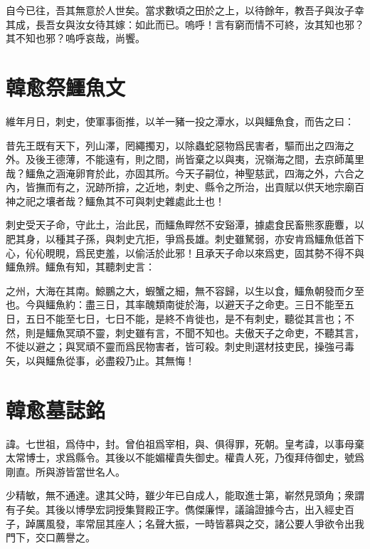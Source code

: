 自今已往，吾其無意於人世矣。當求數頃之田於之上，以待餘年，教吾子與汝子幸其成，長吾女與汝女待其嫁：如此而已。嗚呼！言有窮而情不可終，汝其知也邪？其不知也邪？嗚呼哀哉，尚饗。

\section[祭鱷魚文\quad{\small 韓愈}]{{\normalsize 韓愈}\quad 祭鱷魚文}
{\parindent=0pt 維年月日，刺史，使軍事衙推，以羊一豬一投之潭水，以與鱷魚食，而告之曰：}

昔先王既有天下，列山澤，罔繩擉刃，以除蟲蛇惡物爲民害者，驅而出之四海之外。及後王德薄，不能遠有，則之間，尚皆棄之以與夷，況嶺海之間，去京師萬里哉？鱷魚之涵淹卵育於此，亦固其所。今天子嗣位，神聖慈武，四海之外，六合之內，皆撫而有之，況跡所揜，之近地，刺史、縣令之所治，出貢賦以供天地宗廟百神之祀之壤者哉？鱷魚其不可與刺史雜處此土也！

刺史受天子命，守此土，治此民，而鱷魚睅然不安谿潭，據處食民畜熊豕鹿麞，以肥其身，以種其子孫，與刺史亢拒，爭爲長雄。刺史雖駑弱，亦安肯爲鱷魚低首下心，伈伈睍睍，爲民吏羞，以偷活於此邪！且承天子命以來爲吏，固其勢不得不與鱷魚辨。鱷魚有知，其聽刺史言：

之州，大海在其南。鯨鵬之大，蝦蟹之細，無不容歸，以生以食，鱷魚朝發而夕至也。今與鱷魚約：盡三日，其率醜類南徙於海，以避天子之命吏。三日不能至五日，五日不能至七日，七日不能，是終不肯徙也，是不有刺史，聽從其言也；不然，則是鱷魚冥頑不靈，刺史雖有言，不聞不知也。夫傲天子之命吏，不聽其言，不徙以避之；與冥頑不靈而爲民物害者，皆可殺。刺史則選材技吏民，操強弓毒矢，以與鱷魚從事，必盡殺乃止。其無悔！

\section[柳子厚墓誌銘\quad{\small 韓愈}]{{\normalsize 韓愈}\quad {}墓誌銘}
諱。七世祖，爲侍中，封。曾伯祖爲宰相，與、俱得罪，死朝。皇考諱，以事母棄太常博士，求爲縣令。其後以不能媚權貴失御史。權貴人死，乃復拜侍御史，號爲剛直。所與游皆當世名人。

少精敏，無不通達。逮其父時，雖少年已自成人，能取進士第，嶄然見頭角；衆謂有子矣。其後以博學宏詞授集賢殿正字。儁傑廉悍，議論證據今古，出入經史百子，踔厲風發，率常屈其座人；名聲大振，一時皆慕與之交，諸公要人爭欲令出我門下，交口薦譽之。


